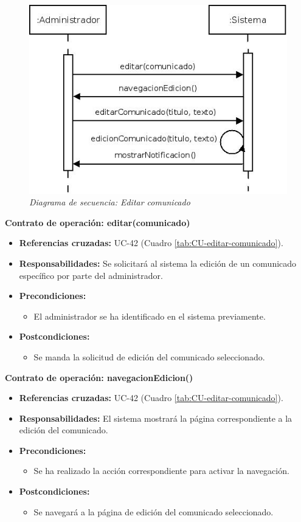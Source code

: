 \begin{figure}[H]
\centering
  \includegraphics[scale=.55]{img/secuencias/editar-comunicado.jpeg}
  \caption{\textit{Diagrama de secuencia: Editar comunicado}}
  \label{fig:secuencia-editar-comunicado}
\end{figure}

\textbf{Contrato de operación: editar(comunicado)}
\begin{itemize}
\item \textbf{Referencias cruzadas:} UC-42 (Cuadro \ref{tab:CU-editar-comunicado}).
\item \textbf{Responsabilidades:} Se solicitará al sistema la edición de un comunicado específico por parte del administrador.
\item \textbf{Precondiciones:} 
 \begin{itemize}
\item El administrador se ha identificado en el sistema previamente.
\end {itemize}
\item \textbf{Postcondiciones:} 
 \begin{itemize}
\item Se manda la solicitud de edición del comunicado seleccionado.
\end {itemize}
\end {itemize}

\textbf{Contrato de operación: navegacionEdicion()}
\begin{itemize}
\item \textbf{Referencias cruzadas:} UC-42 (Cuadro \ref{tab:CU-editar-comunicado}).
\item \textbf{Responsabilidades:} El sistema mostrará la página correspondiente a la edición del comunicado.
\item \textbf{Precondiciones:} 
 \begin{itemize}
\item Se ha realizado la acción correspondiente para activar la navegación.
\end {itemize}
\item \textbf{Postcondiciones:} 
 \begin{itemize}
\item Se navegará a la página de edición del comunicado seleccionado.
\end {itemize}
\end {itemize}

